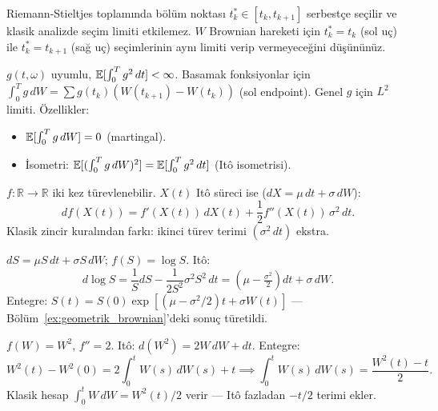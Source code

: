 \begin{kesif}
Riemann-Stieltjes toplamında bölüm noktası $t^*_k \in [t_k, t_{k+1}]$ serbestçe
seçilir ve klasik analizde seçim limiti etkilemez. $W$ Brownian hareketi için
$t^*_k = t_k$ (sol uç) ile $t^*_k = t_{k+1}$ (sağ uç) seçimlerinin aynı limiti
verip vermeyeceğini düşününüz.
\end{kesif}

\begin{tanim}\label{def:ito_integral}
$g(t,\omega)$ uyumlu, $\mathbb{E}[\int_0^T g^2\,dt]<\infty$. Basamak fonksiyonlar için $\int_0^T g\,dW = \sum g(t_k)(W(t_{k+1})-W(t_k))$ (sol endpoint). Genel $g$ için $L^2$ limiti. Özellikler:
\begin{itemize}
  \item $\mathbb{E}[\int_0^T g\,dW]=0$ (martingal).
  \item İsometri: $\mathbb{E}[(\int_0^T g\,dW)^2]=\mathbb{E}[\int_0^T g^2\,dt]$ (Itô isometrisi).
\end{itemize}
\end{tanim}

\begin{teorem}\label{thm:ito_formul}
$f:\mathbb{R}\to\mathbb{R}$ iki kez türevlenebilir. $X(t)$ Itô süreci ise ($dX=\mu\,dt+\sigma\,dW$):
\[
  df(X(t)) = f'(X(t))\,dX(t) + \frac{1}{2}f''(X(t))\,\sigma^2\,dt.
\]
Klasik zincir kuralından farkı: ikinci türev terimi $(\sigma^2\,dt)$ ekstra.
\end{teorem}

\begin{ornek}\label{ex:gbm_ito}
$dS=\mu S\,dt+\sigma S\,dW$; $f(S)=\log S$. Itô:
\[
  d\log S = \frac{1}{S}dS - \frac{1}{2S^2}\sigma^2 S^2\,dt = (\mu-\tfrac{\sigma^2}{2})dt+\sigma\,dW.
\]
Entegre: $S(t)=S(0)\exp[(\mu-\sigma^2/2)t+\sigma W(t)]$ --- Bölüm~\ref{ex:geometrik_brownian}'deki sonuç türetildi.
\end{ornek}

\begin{ornek}[$W^2(t)$ hesabı]\label{ex:w2_ito}
$f(W)=W^2$, $f''=2$. Itô: $d(W^2)=2W\,dW+dt$. Entegre:
\[
  W^2(t)-W^2(0)=2\int_0^t W(s)\,dW(s)+t \implies \int_0^t W(s)\,dW(s)=\frac{W^2(t)-t}{2}.
\]
Klasik hesap $\int_0^t W\,dW = W^2(t)/2$ verir --- Itô fazladan $-t/2$ terimi ekler.
\end{ornek}

